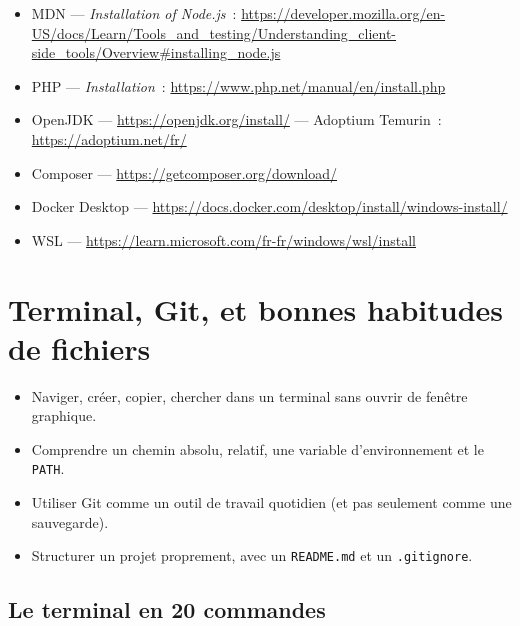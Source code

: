 \documentclass[12pt,a4paper,twoside,openright]{book}
\newcommand{\fichier}[1]{\texttt{\color{pathgreen}#1}}
\begin{document}
\begin{ressources}
\begin{itemize}
  \item MDN --- \emph{Installation of Node.js}~: \url{https://developer.mozilla.org/en-US/docs/Learn/Tools_and_testing/Understanding_client-side_tools/Overview#installing_node.js}
  \item PHP --- \emph{Installation}~: \url{https://www.php.net/manual/en/install.php}
  \item OpenJDK --- \url{https://openjdk.org/install/} --- Adoptium Temurin~: \url{https://adoptium.net/fr/}
  \item Composer --- \url{https://getcomposer.org/download/}
  \item Docker Desktop --- \url{https://docs.docker.com/desktop/install/windows-install/}
  \item WSL --- \url{https://learn.microsoft.com/fr-fr/windows/wsl/install}
\end{itemize}
\end{ressources}

\chapter{Terminal, Git, et bonnes habitudes de fichiers}
\label{ch-git}

\begin{objectif}
\begin{itemize}
  \item Naviger, cr\'eer, copier, chercher dans un terminal sans ouvrir de fen\^etre graphique.
  \item Comprendre un chemin absolu, relatif, une variable d'environnement et le \verb|PATH|.
  \item Utiliser Git comme un outil de travail quotidien (et pas seulement comme une sauvegarde).
  \item Structurer un projet proprement, avec un \fichier{README.md} et un \fichier{.gitignore}.
\end{itemize}
\end{objectif}

\section{Le terminal en 20 commandes}
\end{document}
